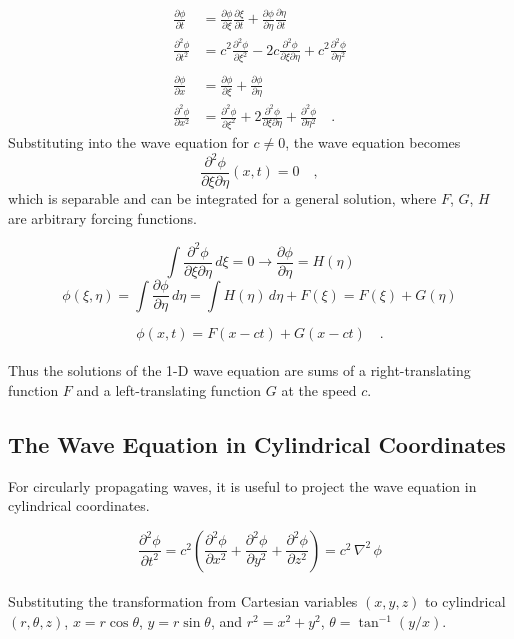 \documentclass{homework}
\begin{document}
\begin{align*}
\frac{\partial \phi}{\partial t} &= \frac{\partial \phi}{\partial \xi} \frac{\partial \xi}{\partial t} + \frac{\partial \phi}{\partial \eta} \frac{\partial \eta}{\partial t}
\\
\frac{\partial^2 \phi}{\partial t^2} &= c^2 \frac{\partial^2 \phi}{\partial \xi^2} -2c \frac{\partial^2 \phi}{\partial \xi \partial \eta} + c^2 \frac{\partial^2 \phi}{\partial \eta^2}
\\ \\
\frac{\partial \phi}{\partial x} &= \frac{\partial \phi}{\partial \xi} + \frac{\partial \phi}{\partial \eta}
\\
\frac{\partial^2 \phi}{\partial x^2} &= \frac{\partial^2 \phi}{\partial \xi^2} + 2 \frac{\partial^2 \phi}{\partial \xi \partial \eta} + \frac{\partial^2 \phi}{\partial \eta^2} \quad .
\end{align*}
\noindent
Substituting into the wave equation for $c \neq 0$, the wave equation becomes
\[ \frac{\partial^2 \phi}{\partial \xi \partial \eta }(x,t) = 0 \quad ,\]
which is separable and can be integrated for a general solution, where $F$, $G$, $H$ are arbitrary forcing functions.

\[ \int \frac{\partial^2 \phi}{\partial \xi \partial \eta } \, d \xi = 0 \rightarrow \frac{\partial \phi}{\partial \eta} = H(\eta) \]
\[ \phi(\xi, \eta) = \int \frac{\partial \phi}{\partial \eta} \, d \eta = \int H(\eta) \, d \eta + F(\xi) = F(\xi ) + G(\eta ) \]

\[ \phi(x, t) = F(x - ct) + G(x - ct) \quad .\]
\\ \noindent
Thus the solutions of the 1-D wave equation are sums of a right-translating function $F$ and a left-translating function $G$ at the speed $c$.

\newpage
\subsection{The Wave Equation in Cylindrical Coordinates}
For circularly propagating waves, it is useful to project the wave equation in cylindrical coordinates.

\[ \frac{\partial^2 \phi}{\partial t^2} = c^2 \left(\frac{\partial^2 \phi}{\partial x^2} + \frac{\partial^2 \phi}{\partial y^2} + \frac{\partial^2 \phi}{\partial z^2}  \right) = c^2 \,\nabla^2 \, \phi \]
\\ \noindent
Substituting the transformation from Cartesian variables $(x, y, z)$ to cylindrical $(r, \theta, z)$, $ x = r \cos{\theta}$, $y = r \sin{\theta}$, and $r^2 = x^2 + y^2$, $\theta =\tan^{-1} (y / x)$. 
\end{document}
